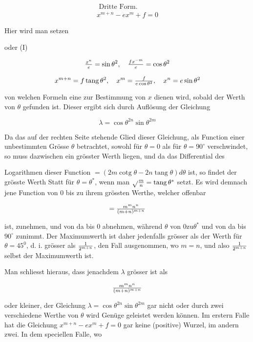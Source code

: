 \documentclass[twoside,12pt, showframe]{memoir}
\let\oldfrac\frac
\def\frac#1#2{\mathchoice{\tfrac{#1}{#2}}{\oldfrac{#1}{#2}}{\genfrac{}{}{}{2}{#1}{#2\mathstrut}}{\genfrac{}{}{}{3}{#1}{#2\mathstrut}}}
\begin{document}
\[
\begin{gathered}
\text { Dritte Form. } \\
x^{m+n}-e x^{m}+f=0
\end{gathered}
\]

Hier wird man setzen

oder (I)

\[
\frac{x^{n}}{e}=\sin \theta^{2}, \quad \frac{f x^{-m}}{e}=\cos \theta^{2}
\]

\[
x^{m+n}=f \operatorname{tang} \theta^{2}, \quad x^{m}=\frac{f}{e \cos \theta^{2}}, \quad x^{n}=e \sin \theta^{2}
\]

von welchen Formeln eine zur Bestimmung von \(x\) dienen wird, sobald der Werth von \(\theta\) gefunden ist. Dieser ergibt sich durch Auflösung der Gleichung

\[
\lambda=\cos \theta^{2 n} \sin \theta^{2 m}
\]

Da das auf der rechten Seite stehende Glied dieser Gleichung, als Function einer unbestimmten Grösse \(\theta\) betrachtet, sowohl für \(\theta=0\) als für \(\theta=90^{\circ}\) verschwindet, so muss dazwischen ein grösster Werth liegen, und da das Differential des

Logarithmen dieser Function \(=(2 m \operatorname{cotg} \theta-2 n \operatorname{tang} \theta) d \theta\) ist, so findet der grösste Werth Statt für \(\theta=\theta^{*}\), wenn man \(\sqrt{ } \frac{m}{n}=\operatorname{tang} \theta^{*}\) setzt. Es wird demnach jene Function von 0 bis zu ihrem grössten Werthe, welcher offenbar

\[
=\frac{m^{m} n^{n}}{(m+n)^{m+n}}
\]

ist, zunehmen, und von da bis 0 abnehmen, während \(\theta\) von \(0 \mathrm{zu} \theta^{*}\) und von da bis \(90^{\circ}\) zunimmt. Der Maximumwerth ist daher jedenfalls grösser als der Werth für \(\theta=45^{0}\), d. i. grösser als \(\frac{1}{2^{m+n}}\), den Fall ausgenommen, wo \(m=n\), und also \(\frac{1}{2^{m+n}}\) selbst der Maximumwerth ist.

Man schliesst hieraus, dass jenachdem \(\lambda\) grösser ist als

\[
\frac{m^{m} n^{n}}{(m+n)^{m+n}}
\]

oder kleiner, der Gleichung \(\lambda=\cos \theta^{2 n} \sin \theta^{2 m}\) gar nicht oder durch zwei verschiedene Werthe von \(\theta\) wird Genüge geleistet werden können. Im erstern Falle hat die Gleichung \(x^{m+n}-e x^{m}+f=0\) gar keine (positive) Wurzel, im andern zwei. In dem speciellen Falle, wo
\end{document}
